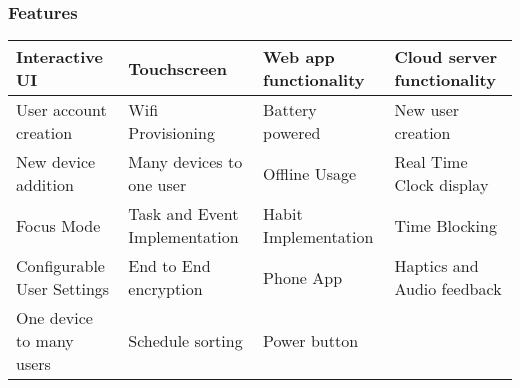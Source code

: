 \documentclass{beamer}
\begin{document}
\begin{frame}
  \frametitle{Features}
\centering
\small
\begin{tabular}{|p{}|p{}|p{}|p{}|}
\hline
\cellcolor[HTML]{CFE2F3}Interactive UI        & Touchscreen                                           & \cellcolor[HTML]{CFE2F3}Web app functionality & \cellcolor[HTML]{CFE2F3}Cloud server functionality \\ \hline
\cellcolor[HTML]{CFE2F3}User account creation & \cellcolor[HTML]{CFE2F3}Wifi Provisioning             & Battery powered                               & \cellcolor[HTML]{CFE2F3}New user creation          \\ \hline
\cellcolor[HTML]{CFE2F3}New device addition                           & \cellcolor[HTML]{CFE2F3}Many devices to one user      & \cellcolor[HTML]{CFE2F3}Offline Usage         & \cellcolor[HTML]{CFE2F3}Real Time Clock display    \\ \hline
\cellcolor[HTML]{CFE2F3}Focus Mode            & \cellcolor[HTML]{CFE2F3}Task and Event Implementation & \cellcolor[HTML]{CFE2F3}Habit Implementation  & Time Blocking                                      \\ \hline
Configurable User Settings                    & End to End encryption                                 & Phone App                                     & Haptics and Audio feedback                         \\ \hline
One device to many users                      & Schedule sorting                                      & Power button                                  &                                                    \\ \hline
\end{tabular}
\end{frame}
\end{document}
